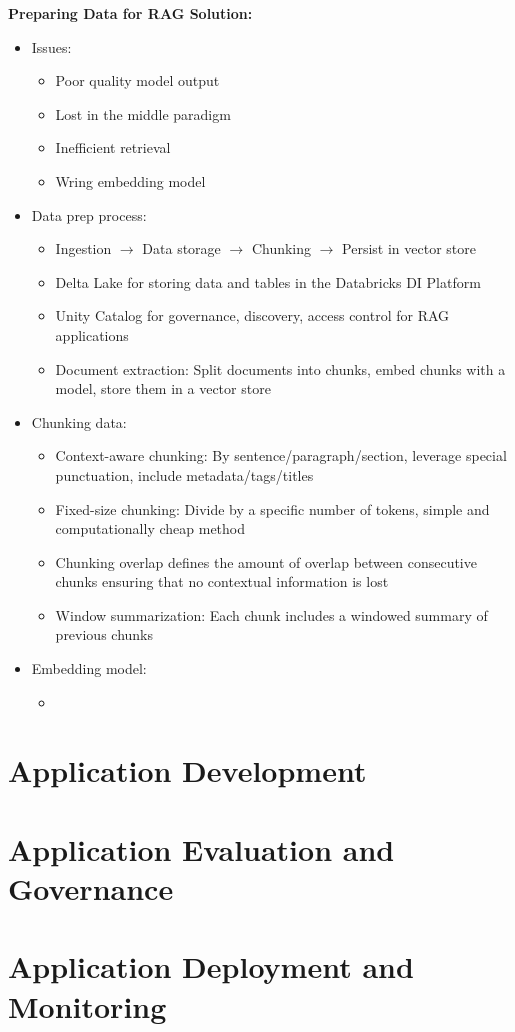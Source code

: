 \documentclass[11pt]{scrartcl}
\begin{document}
\textbf{Preparing Data for RAG Solution:}
\begin{itemize}
	\item Issues:
	\begin{itemize}
		\item Poor quality model output
		\item Lost in the middle paradigm
		\item Inefficient retrieval
		\item Wring embedding model
	\end{itemize}
	\item Data prep process:
	\begin{itemize}
		\item Ingestion $\to$ Data storage $\to$ Chunking $\to$ Persist in vector store
		\item Delta Lake for storing data and tables in the Databricks DI Platform
		\item Unity Catalog for governance, discovery, access control for RAG applications
		\item Document extraction: Split documents into chunks, embed chunks with a model, store them in a vector store
	\end{itemize}
	\item Chunking data:
	\begin{itemize}
		\item Context-aware chunking: By sentence/paragraph/section, leverage special punctuation, include metadata/tags/titles
		\item Fixed-size chunking: Divide by a specific number of tokens, simple and computationally cheap method
		\item Chunking overlap defines the amount of overlap between consecutive chunks ensuring that no contextual information is lost
		\item Window summarization: Each chunk includes a windowed summary of previous chunks
	\end{itemize}
	\item Embedding model:
	\begin{itemize}
		\item 
	\end{itemize}
\end{itemize}



\newpage
\section{Application Development}


\newpage
\section{Application Evaluation and Governance}


\newpage
\section{Application Deployment and Monitoring}
\end{document}
